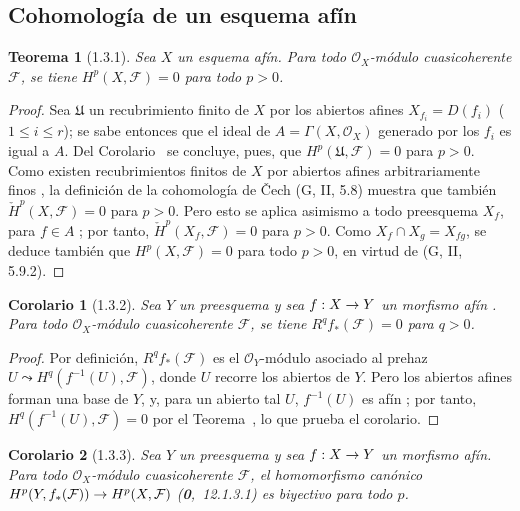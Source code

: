 \documentclass[10pt,oneside,openany]{book}
\theoremstyle{egaenv}\newtheorem*{env}{---}
\theoremstyle{egastatement}
\newtheorem*{theorem}{Teorema}
\newtheorem*{corollary}{Corolario}
\theoremstyle{egadescription}
\renewcommand{\leq}{\leqslant}
\renewcommand{\to}{\mathchoice{\longrightarrow}{\rightarrow}{\rightarrow}{\rightarrow}}
\begin{document}
\subsection{Cohomología de un esquema afín}
\label{subsection:III.1.3}
\label{subsection:III.1.3-fr}

\begin{theorem}[1.3.1]
\label{III.1.3.1}
\label{III.1.3.1-fr}
Sea $X$ un esquema afín.
Para todo $\mathcal O_X$-módulo cuasicoherente $\mathcal F$, se tiene $H^p(X,\mathcal F)=0$ para todo $p>0$.
\end{theorem}

\begin{proof}
Sea $\mathfrak U$ un recubrimiento finito de $X$ por los abiertos afines $X_{f_i}=D(f_i)$ ($1\leq i\leq r$); se sabe entonces que el ideal de $A=\Gamma(X,\mathcal O_X)$ generado por los $f_i$ es igual a $A$.
Del Corolario~ se concluye, pues, que $H^p(\mathfrak U,\mathcal F)=0$ para $p>0$.
Como existen recubrimientos finitos de $X$ por abiertos afines arbitrariamente finos , la definición de la cohomología de \v Cech (G, II, 5.8) muestra que también $\check H^p(X,\mathcal F)=0$ para $p>0$.
Pero esto se aplica asimismo a todo preesquema $X_f$, para $f\in A$ ; por tanto, $\check H^p(X_f,\mathcal F)=0$ para $p>0$.
Como $X_f\cap X_g=X_{fg}$, se deduce también que $H^p(X,\mathcal F)=0$ para todo $p>0$, en virtud de (G, II, 5.9.2).
\end{proof}

\begin{corollary}[1.3.2]
\label{III.1.3.2}
\label{III.1.3.2-fr}
Sea $Y$ un preesquema y sea $f:X\to Y$ un morfismo afín \textup{}.
Para todo $\mathcal O_X$-módulo cuasicoherente $\mathcal F$, se tiene $R^qf_*(\mathcal F)=0$ para $q>0$.
\end{corollary}

\begin{proof}
Por definición, $R^qf_*(\mathcal F)$ es el $\mathcal O_Y$-módulo asociado al prehaz $U\leadsto H^q(f^{-1}(U),\mathcal F)$, donde $U$ recorre los abiertos de $Y$.
Pero los abiertos afines forman una base de $Y$, y, para un abierto tal $U$, $f^{-1}(U)$ es afín ; por tanto, $H^q(f^{-1}(U),\mathcal F)=0$ por el Teorema~, lo que prueba el corolario.
\end{proof}

\begin{corollary}[1.3.3]
\label{III.1.3.3}
\label{III.1.3.3-fr}
Sea $Y$ un preesquema y sea $f:X\to Y$ un morfismo afín.
Para todo $\mathcal O_X$-módulo cuasicoherente $\mathcal F$, el homomorfismo canónico $H^p(Y,f_*(\mathcal F))\to H^p(X,\mathcal F)$ \textup{(\textbf{0},~12.1.3.1)} es biyectivo para todo $p$.
\end{corollary}
\end{document}

